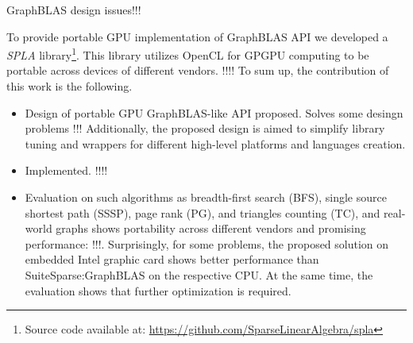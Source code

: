 GraphBLAS design issues!!! 

To provide portable GPU implementation of GraphBLAS API we developed a \textit{SPLA} library\footnote{Source code available at: \url{https://github.com/SparseLinearAlgebra/spla}}.
This library utilizes OpenCL for GPGPU computing to be portable across devices of different vendors.
!!!!
To sum up, the contribution of this work is the following.
\begin{itemize}
    \item Design of portable GPU GraphBLAS-like API proposed. Solves some desingn problems !!! Additionally, the proposed design is aimed to simplify library tuning and wrappers for different high-level platforms and languages creation.
    \item Implemented. !!!!
    \item Evaluation on such algorithms as breadth-first search (BFS), single source shortest path (SSSP), page rank (PG), and triangles counting (TC), and real-world graphs shows portability across different vendors and promising performance: !!!. Surprisingly, for some problems, the proposed solution on embedded Intel graphic card shows better performance than SuiteSparse:GraphBLAS on the respective CPU. At the same time, the evaluation shows that further optimization is required.
\end{itemize}